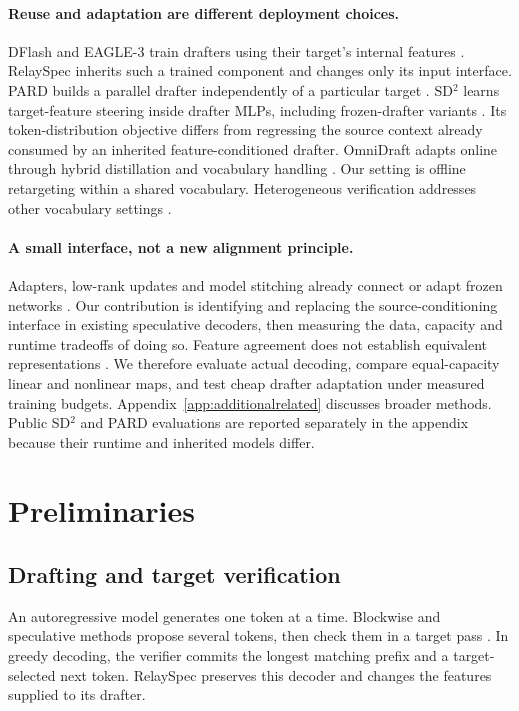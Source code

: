\documentclass{article}
\begin{document}
\paragraph{Reuse and adaptation are different deployment choices.}
DFlash and EAGLE-3 train drafters using their target's internal features
\citep{chen2026dflash,li2025eagle3}. RelaySpec inherits such a trained
component and changes only its input interface. PARD builds a parallel
drafter independently of a particular target \citep{an2026pard}.
SD$^2$ learns target-feature steering inside drafter MLPs, including
frozen-drafter variants \citep{berdoz2026sd2}. Its token-distribution
objective differs from regressing the source context already consumed
by an inherited feature-conditioned drafter. OmniDraft adapts online
through hybrid distillation and vocabulary handling
\citep{ramakrishnan2025omnidraft}. Our setting is offline retargeting
within a shared vocabulary. Heterogeneous verification addresses other
vocabulary settings \citep{timor2025heterogeneous}.

\paragraph{A small interface, not a new alignment principle.}
Adapters, low-rank updates and model stitching already connect or adapt
frozen networks \citep{houlsby2019adapters,hu2022lora,bansal2021stitching}.
Our contribution is identifying and replacing the source-conditioning
interface in existing speculative decoders, then measuring the data,
capacity and runtime tradeoffs of doing so. Feature agreement does not
establish equivalent representations \citep{smith2025stitching}.
We therefore evaluate actual decoding, compare equal-capacity linear
and nonlinear maps, and test cheap drafter adaptation under measured
training budgets. Appendix~\ref{app:additionalrelated} discusses broader
methods. Public SD$^2$ and PARD evaluations are reported separately in
the appendix because their runtime and inherited models differ.

\section{Preliminaries}
\label{sec:preliminaries}
\subsection{Drafting and target verification}
An autoregressive model generates one token at a time. Blockwise and
speculative methods propose several tokens, then check them in a target
pass \citep{stern2018blockwise,xia2023specdec,leviathan2023speculative}.
In greedy decoding, the verifier commits the longest matching prefix
and a target-selected next token. RelaySpec preserves this decoder and
changes the features supplied to its drafter.
\end{document}
